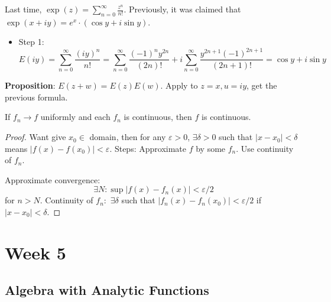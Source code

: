 \documentclass{report}
\begin{document}
Last time, $\exp(z) = \sum_{n = 0}^{\infty}\frac{z^{n}}{n!}$. Previously, it was claimed that $\exp(x + iy) = e^{x} \cdot (\cos{y} + i\sin{y})$.
    \begin{itemize}
        \item Step 1: 
            \begin{equation*}
                E(iy) = \sum_{n = 0}^{\infty} \dfrac{(iy)^{n}}{n!} = \sum_{n = 0}^{\infty} \dfrac{(-1)^{n}y^{2n}}{(2n)!} + i \sum_{n = 0}^{\infty}\dfrac{y^{2n + 1}(-1)^{2n + 1}}{(2n + 1)!} = \cos{y} + i\sin{y}
            \end{equation*}
    \end{itemize}

\textbf{Proposition}: $E(z + w) = E(z)E(w)$. Apply to $z = x, u = iy$, get the previous formula.

\begin{theorem}{}
    If $f_{n} \rightarrow f$ uniformly and each $f_{n}$ is continuous, then $f$ is continuous. 
\end{theorem}
    \begin{proof}
        Want give $x_{0} \in$ domain, then for any $\varepsilon > 0$, $\exists \delta > 0$ such that $\lvert x - x_{0} \rvert < \delta$ means $\lvert f(x) - f(x_{0}) \rvert < \varepsilon$. Steps: Approximate $f$ by some $f_{n}$. Use continuity of $f_{n}$.

        Approximate convergence: 
            \begin{equation*}
                \exists N : \sup\lvert f(x) - f_{n}(x) \rvert < \varepsilon/2
            \end{equation*}
        for $n > N$. Continuity of $f_{n} :$ $\exists \delta$ such that $\lvert f_{n}(x) - f_{n}(x_{0}) \rvert < \varepsilon/2$ if $\lvert x - x_{0} \rvert < \delta$.
    \end{proof}

\chapter{Week 5}

\begin{topic}
    \section{Algebra with Analytic Functions}
\end{topic}
\end{document}
